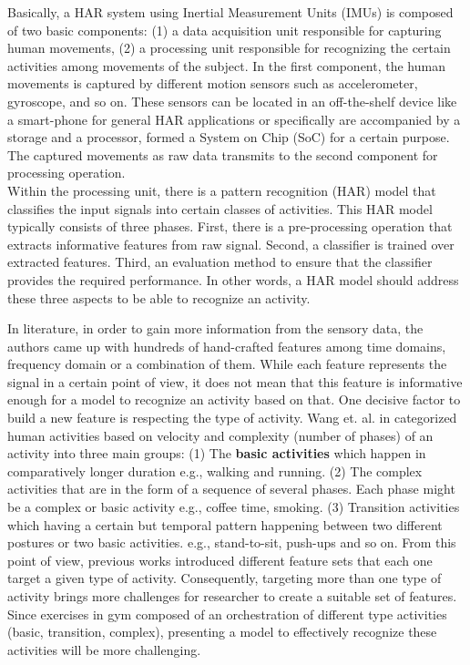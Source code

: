\documentclass[journal,article,submit,moreauthors,pdftex]{Definitions/mdpi}
\begin{document}
Basically, a HAR system using Inertial Measurement Units (IMUs) is composed of two basic components: (1) a data acquisition unit responsible for capturing human movements, (2) a processing unit responsible for recognizing the certain activities among movements of the subject\cite{rosati2018comparison}. In the first component, the human movements is captured by different motion sensors such as accelerometer, gyroscope, and so on. These sensors can be located in an off-the-shelf device like a smart-phone for general HAR applications or specifically are accompanied by a storage and a processor, formed a System on Chip (SoC) for a certain purpose. The captured movements as raw data transmits to the second component for processing operation.\\
Within the processing unit, there is a pattern recognition (HAR) model that classifies the input signals into certain classes of activities. This HAR model typically consists of three phases. First, there is a pre-processing operation that extracts informative features from raw signal. Second, a classifier is trained over extracted features. Third, an evaluation method to ensure that the classifier provides the required performance\cite{kolodziej2019registration}. In other words, a HAR model should address these three aspects to be able to recognize an activity.


In literature, in order to gain more information from the sensory data, the authors came up with hundreds of hand-crafted features among time domains, frequency domain or a combination of them. While each feature represents the signal in a certain point of view, it does not mean that this feature is informative enough for a model to recognize an activity based on that. One decisive factor to build a new feature is respecting the type of activity. Wang et. al. in \cite{wang2019survey} categorized human activities based on velocity and complexity (number of phases) of an activity into three main groups: (1) The \textbf{basic activities} which happen in comparatively longer duration e.g., walking and running. (2)  The complex activities that are in the form of a sequence of several phases. Each phase might be a complex or basic activity e.g., coffee time, smoking. (3) Transition activities which having a certain but temporal pattern happening between two different postures or two basic activities. e.g., stand-to-sit, push-ups and so on. From this point of view, previous works introduced  different feature sets that each one target a given type of activity. Consequently, targeting more than one type of activity brings more challenges for researcher to create a suitable set of features. Since exercises in gym composed of an orchestration of different type activities (basic, transition, complex), presenting a model to effectively recognize these activities will be more challenging.
\end{document}

